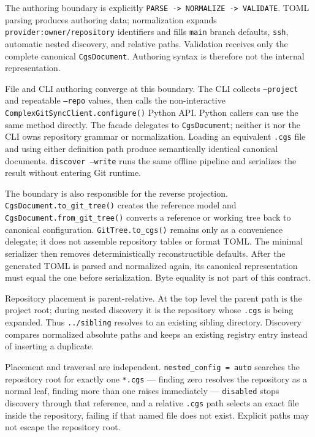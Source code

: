 The authoring boundary is explicitly
\texttt{PARSE -> NORMALIZE -> VALIDATE}.  TOML parsing produces authoring data;
normalization expands \texttt{provider:owner/repository} identifiers and fills
\texttt{main} branch defaults, \texttt{ssh}, automatic nested discovery, and
relative paths.  Validation receives only the complete canonical
\texttt{CgsDocument}.  Authoring syntax is therefore not the internal
representation.

File and CLI authoring converge at this boundary. The CLI collects
\texttt{--project} and repeatable \texttt{--repo} values, then calls the
non-interactive \texttt{ComplexGitSyncClient.configure()} Python API. Python
callers can use the same method directly. The facade delegates to
\texttt{CgsDocument}; neither it nor the CLI owns repository grammar or
normalization. Loading an equivalent \texttt{.cgs} file and using either
definition path produce semantically identical canonical documents.
\texttt{discover --write} runs the same offline pipeline and serializes the
result without entering Git runtime.

The boundary is also responsible for the reverse projection.
\texttt{CgsDocument.to\_git\_tree()} creates the reference model and
\texttt{CgsDocument.from\_git\_tree()} converts a reference or working tree
back to canonical configuration. \texttt{GitTree.to\_cgs()} remains only as a
convenience delegate; it does not assemble repository tables or format TOML.
The minimal serializer then removes deterministically reconstructible defaults.
After the generated TOML is parsed and normalized again, its canonical
representation must equal the one before serialization. Byte equality is not
part of this contract.

Repository placement is parent-relative. At the top level the parent path is
the project root; during nested discovery it is the repository whose
\texttt{.cgs} is being expanded. Thus \texttt{../sibling} resolves to an
existing sibling directory. Discovery compares normalized absolute paths and
keeps an existing registry entry instead of inserting a duplicate.

Placement and traversal are independent. \texttt{nested\_config = auto}
searches the repository root for exactly one \texttt{*.cgs} — finding zero
resolves the repository as a normal leaf, finding more than one raises
immediately — \texttt{disabled} stops discovery through that reference, and
a relative \texttt{.cgs} path selects an exact file inside the repository,
failing if that named file does not exist. Explicit paths may not escape
the repository root.

